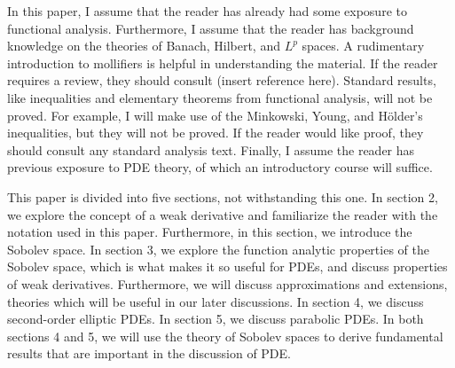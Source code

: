 \documentclass[11pt]{amsart}
\theoremstyle{plain}
\theoremstyle{definition}
\theoremstyle{remark}
\numberwithin{theorem}{section}
\numberwithin{proposition}{section}
\numberwithin{remark}{section}
\numberwithin{corollary}{section}
\numberwithin{definition}{section}
\numberwithin{lemma}{section}
\numberwithin{equation}{section}
\begin{document}
In this paper, I assume that the reader has already had some exposure to functional analysis. Furthermore, I assume that the reader has background knowledge on the theories of Banach, Hilbert, and $L^p$ spaces. A rudimentary introduction to mollifiers is helpful in understanding the material. If the reader requires a review, they should consult (insert reference here). Standard results, like inequalities and elementary theorems from functional analysis, will not be proved. For example, I will make use of the Minkowski, Young, and H\"older's inequalities, but they will not be proved. If the reader would like proof, they should consult any standard analysis text. Finally, I assume the reader has previous exposure to PDE theory, of which an introductory course will suffice.  

This paper is divided into five sections, not withstanding this one. In section 2, we explore the concept of a weak derivative and familiarize the reader with the notation used in this paper. Furthermore, in this section, we introduce the Sobolev space. In section 3, we explore the function analytic properties of the Sobolev space, which is what makes it so useful for PDEs, and discuss properties of weak derivatives. Furthermore, we will discuss approximations and extensions, theories which will be useful in our later discussions. In section 4, we discuss second-order elliptic PDEs. In section 5, we discuss parabolic PDEs. In both sections 4 and 5, we will use the theory of Sobolev spaces to derive fundamental results that are important in the discussion of PDE. 
\end{document}
